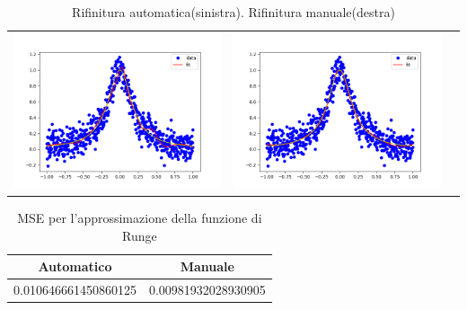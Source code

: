 \documentclass[../main.tex]{subfiles}
\begin{document}
\begin{table}
    \centering
    \caption{Rifinitura automatica(sinistra). Rifinitura manuale(destra)\label{tab:runge_fit}}
        \begin{tabular}{ccc}
             \includegraphics[width=0.45\linewidth]{Immagini/esempi/runge_auto.png}
            & \includegraphics[width=0.45\linewidth]{Immagini/esempi/runge_mano.png}\\[-4pt]
        \end{tabular}%
\end{table}

\begin{table}[h!]
    \centering
    \caption{MSE per l'approssimazione della funzione di Runge}\label{tab:runge_mse}
     \begin{tabular}{||c c ||} 
     \hline
     Automatico & Manuale \\ [0.5ex] 
     \hline\hline
     0.010646661450860125 & 0.00981932028930905 \\  [1ex] 
     \hline
     \end{tabular}
    \end{table}
\end{document}

